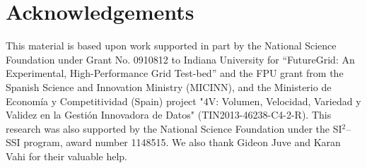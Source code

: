 \documentclass[final,5p,times,twocolumn]{elsarticle}
\begin{document}








\section*{Acknowledgements}

This material is based upon work supported in part by the National Science Foundation under Grant No. 0910812 to Indiana University for ``FutureGrid: An Experimental, High-Performance Grid Test-bed'' and the FPU grant from the Spanish Science and Innovation Ministry (MICINN), and the Ministerio de Econom\'ia y Competitividad (Spain) project "4V: Volumen, Velocidad, Variedad y Validez en la Gesti\'on Innovadora de Datos" (TIN2013-46238-C4-2-R). This research was also supported by the National Science Foundation under the SI$^2$--SSI program, award number 1148515. We also thank Gideon Juve and Karan Vahi for their valuable help.




\end{document}
